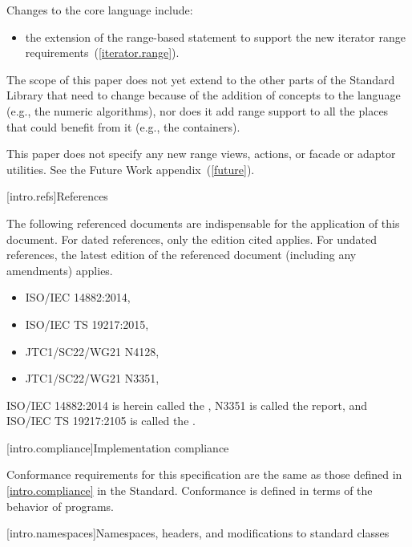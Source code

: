 \pnum
Changes to the core language include:

\begin{itemize}
\item the extension of the range-based  statement to support
the new iterator range requirements~(\ref{iterator.range}).
\end{itemize}

\pnum
The scope of this paper does not yet extend to the other parts of the Standard Library
that need to change because of the addition of concepts to the language (e.g., the numeric
algorithms), nor does it add range support to all the places that could benefit from it (e.g.,
the containers).

\pnum
This paper does not specify any new range views, actions, or facade or adaptor
utilities. See the Future Work appendix~(\ref{future}).

[intro.refs]{References}

\pnum
The following referenced documents are indispensable for the
application of this document. For dated references, only the
edition cited applies. For undated references, the latest edition
of the referenced document (including any amendments) applies.

\begin{itemize}
\item ISO/IEC 14882:2014, 
\item ISO/IEC TS 19217:2015, 
\item JTC1/SC22/WG21 N4128, 
\item JTC1/SC22/WG21 N3351, 
\end{itemize}

ISO/IEC 14882:2014 is herein called the , N3351 is called the
 report, and ISO/IEC TS 19217:2105 is called the .

[intro.compliance]{Implementation compliance}

\pnum
Conformance requirements for this specification are the same as those
defined in \ref{intro.compliance} in the \Cpp Standard.
\enternote
Conformance is defined in terms of the behavior of programs.
\exitnote

[intro.namespaces]{Namespaces, headers, and modifications to standard classes}

